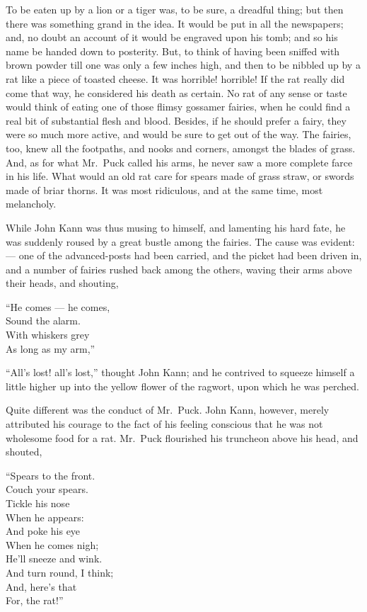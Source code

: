 \documentclass[
  12pt,
  a5paper,
  twoside]{book}
\begin{document}
To be eaten up by a lion or a tiger was, to be sure, a dreadful thing;
but then there was something grand in the idea. It would be put in all
the newspapers; and, no doubt an account of it would be engraved upon
his tomb; and so his name be handed down to posterity. But, to think of
having been sniffed with brown powder till one was only a few inches
high, and then to be nibbled up by a rat like a piece of toasted cheese.
It was horrible! horrible! If the rat really did come that way, he
considered his death as certain. No rat of any sense or taste would
think of eating one of those flimsy gossamer fairies, when he could find
a real bit of substantial flesh and blood. Besides, if he should prefer
a fairy, they were so much more active, and would be sure to get out of
the way. The fairies, too, knew all the footpaths, and nooks and
corners, amongst the blades of grass. And, as for what Mr.~Puck called
his arms, he never saw a more complete farce in his life. What would an
old rat care for spears made of grass straw, or swords made of briar
thorns. It was most ridiculous, and at the same time, most melancholy.

While John Kann was thus musing to himself, and lamenting his hard fate,
he was suddenly roused by a great bustle among the fairies. The cause
was evident:--- one of the advanced-posts had been carried, and the
picket had been driven in, and a number of fairies rushed back among the
others, waving their arms above their heads, and shouting,

``He comes --- he comes,\\
Sound the alarm.\\
With whiskers grey\\
As long as my arm,''

``All's lost! all's lost,'' thought John Kann; and he contrived to
squeeze himself a little higher up into the yellow flower of the
ragwort, upon which he was perched.

Quite different was the conduct of Mr.~Puck. John Kann, however, merely
attributed his courage to the fact of his feeling conscious that he was
not wholesome food for a rat. Mr.~Puck flourished his truncheon above
his head, and shouted,

``Spears to the front.\\
Couch your spears.\\
Tickle his nose\\
When he appears:\\
And poke his eye\\
When he comes nigh;\\
He'll sneeze and wink.\\
And turn round, I think;\\
And, here's that\\
For, the rat!''
\end{document}
